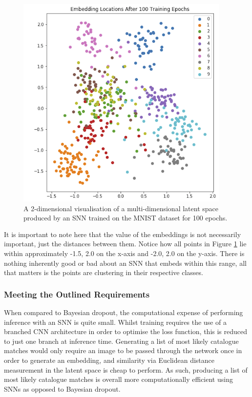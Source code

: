 \begin{figure}
	\begin{center}
		\includegraphics[scale=0.5]{Chapter5/figs/mnist-class-clusters-PCA.png}
	\end{center}
	\caption{A 2-dimensional visualisation of a multi-dimensional latent space produced by an SNN trained on the MNIST dataset \cite{lecun_gradient-based_1998} for 100 epochs.}
	\label{fig:mnist-class-clusters-PCA}
\end{figure}

It is important to note here that the value of the embeddings is not necessarily important, just the distances between them. Notice how all points in Figure \ref{fig:mnist-class-clusters-PCA} lie within approximately -1.5, 2.0 on the x-axis and -2.0, 2.0 on the y-axis. There is nothing inherently good or bad about an SNN that embeds within this range, all that matters is the points are clustering in their respective classes.

\subsubsection{Meeting the Outlined Requirements}\label{ch:ID,sec:deciding,sub:SNN,subsub:meetingOutlinedRequirements}

When compared to Bayesian dropout, the computational expense of performing inference with an SNN is quite small. Whilst training requires the use of a branched CNN architecture in order to optimise the loss function, this is reduced to just one branch at inference time. Generating a list of most likely catalogue matches would only require an image to be passed through the network once in order to generate an embedding, and similarity via Euclidean distance measurement in the latent space is cheap to perform. As such, producing a list of most likely catalogue matches is overall more computationally efficient using SNNs as opposed to Bayesian dropout. 

